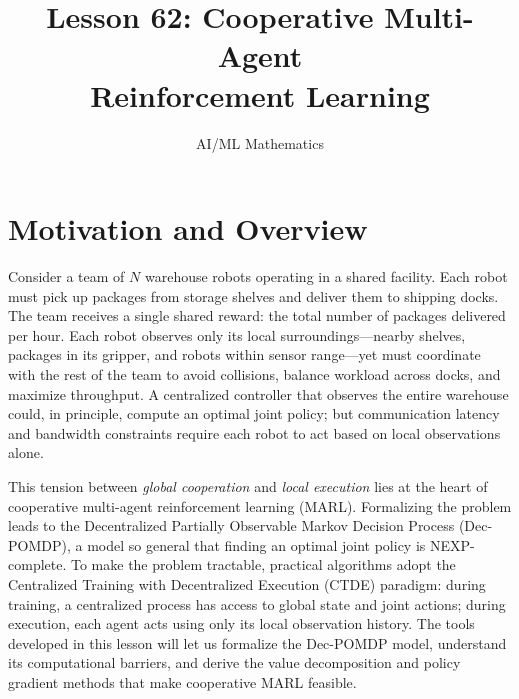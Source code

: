 \documentclass[11pt,a4paper]{article}
\title{Lesson 62: Cooperative Multi-Agent\\Reinforcement Learning}
\author{AI/ML Mathematics}
\date{}
\begin{document}
\maketitle
\tableofcontents
\newpage

\section{Motivation and Overview}
\label{sec:motivation}

Consider a team of $N$ warehouse robots operating in a shared facility.
Each robot must pick up packages from storage shelves and deliver them
to shipping docks.  The team receives a single shared reward: the total
number of packages delivered per hour.  Each robot observes only its
local surroundings---nearby shelves, packages in its gripper, and
robots within sensor range---yet must coordinate with the rest of
the team to avoid collisions, balance workload across docks, and
maximize throughput.  A centralized controller that observes the
entire warehouse could, in principle, compute an optimal joint
policy; but communication latency and bandwidth constraints
require each robot to act based on local observations alone.

This tension between \emph{global cooperation} and \emph{local
execution} lies at the heart of cooperative multi-agent reinforcement
learning (MARL).  Formalizing the problem leads to the Decentralized
Partially Observable Markov Decision Process (Dec-POMDP), a model
so general that finding an optimal joint policy is NEXP-complete.
To make the problem tractable, practical algorithms adopt the
Centralized Training with Decentralized Execution (CTDE) paradigm:
during training, a centralized process has access to global state
and joint actions; during execution, each agent acts using only its
local observation history.  The tools developed in this lesson will
let us formalize the Dec-POMDP model, understand its computational
barriers, and derive the value decomposition and policy gradient
methods that make cooperative MARL feasible.
\end{document}
